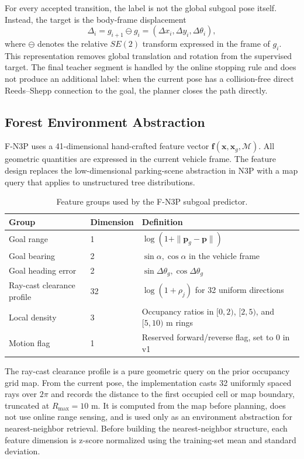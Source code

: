 \documentclass[11pt,a4paper]{article}
\begin{document}
For every accepted transition, the label is not the global subgoal pose itself. Instead, the target is the body-frame displacement
\begin{equation}
\Delta_i = g_{i+1}\ominus g_i = (\Delta x_i,\Delta y_i,\Delta\theta_i),
\end{equation}
where $\ominus$ denotes the relative $SE(2)$ transform expressed in the frame of $g_i$. This representation removes global translation and rotation from the supervised target. The final teacher segment is handled by the online stopping rule and does not produce an additional label: when the current pose has a collision-free direct Reeds--Shepp connection to the goal, the planner closes the path directly.

\subsection{Forest Environment Abstraction}
\label{sec:method_features}

F-N3P uses a 41-dimensional hand-crafted feature vector $\mathbf{f}(\mathbf{x},\mathbf{x}_g,\mathcal{M})$. All geometric quantities are expressed in the current vehicle frame. The feature design replaces the low-dimensional parking-scene abstraction in N3P with a map query that applies to unstructured tree distributions.

\begin{table}[t]
\centering
\caption{Feature groups used by the F-N3P subgoal predictor.}
\label{tab:features}
\begin{tabular}{lll}
\toprule
Group & Dimension & Definition \\
\midrule
Goal range & 1 & $\log(1+\|\mathbf{p}_g-\mathbf{p}\|)$ \\
Goal bearing & 2 & $\sin\alpha,\cos\alpha$ in the vehicle frame \\
Goal heading error & 2 & $\sin\Delta\theta_g,\cos\Delta\theta_g$ \\
Ray-cast clearance profile & 32 & $\log(1+\rho_j)$ for 32 uniform directions \\
Local density & 3 & Occupancy ratios in $[0,2)$, $[2,5)$, and $[5,10)$ m rings \\
Motion flag & 1 & Reserved forward/reverse flag, set to 0 in v1 \\
\bottomrule
\end{tabular}
\end{table}

The ray-cast clearance profile is a pure geometric query on the prior occupancy grid map. From the current pose, the implementation casts 32 uniformly spaced rays over $2\pi$ and records the distance to the first occupied cell or map boundary, truncated at $R_{\max}=10$ m. It is computed from the map before planning, does not use online range sensing, and is used only as an environment abstraction for nearest-neighbor retrieval. Before building the nearest-neighbor structure, each feature dimension is z-score normalized using the training-set mean and standard deviation.
\end{document}
